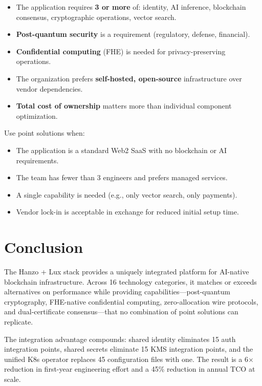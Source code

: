 \documentclass[11pt,twocolumn]{article}
\begin{document}
\begin{itemize}
    \item The application requires \textbf{3 or more} of: identity, AI inference, blockchain consensus, cryptographic operations, vector search.
    \item \textbf{Post-quantum security} is a requirement (regulatory, defense, financial).
    \item \textbf{Confidential computing} (FHE) is needed for privacy-preserving operations.
    \item The organization prefers \textbf{self-hosted, open-source} infrastructure over vendor dependencies.
    \item \textbf{Total cost of ownership} matters more than individual component optimization.
\end{itemize}

Use point solutions when:

\begin{itemize}
    \item The application is a standard Web2 SaaS with no blockchain or AI requirements.
    \item The team has fewer than 3 engineers and prefers managed services.
    \item A single capability is needed (e.g., only vector search, only payments).
    \item Vendor lock-in is acceptable in exchange for reduced initial setup time.
\end{itemize}

\section{Conclusion}
\label{sec:conclusion}

The Hanzo + Lux stack provides a uniquely integrated platform for AI-native blockchain infrastructure. Across 16 technology categories, it matches or exceeds alternatives on performance while providing capabilities---post-quantum cryptography, FHE-native confidential computing, zero-allocation wire protocols, and dual-certificate consensus---that no combination of point solutions can replicate.

The integration advantage compounds: shared identity eliminates 15 auth integration points, shared secrets eliminate 15 KMS integration points, and the unified K8s operator replaces 45 configuration files with one. The result is a 6$\times$ reduction in first-year engineering effort and a 45\% reduction in annual TCO at scale.
\end{document}
